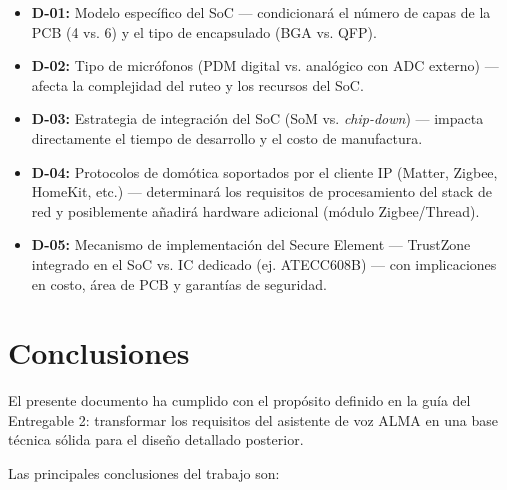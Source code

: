 \documentclass[%
	paper=a4,
	twoside=false,
	parskip=half,
	chapterprefix=false,
	10pt,
	headings=normal,
	bibliography=totoc,
	listof=totoc,
	titlepage=on,
	captions=tableabove,
	draft=false, 
]{scrbook}%
\begin{document}
\begin{itemize}
    \item \textbf{D-01:} Modelo específico del SoC — condicionará el número de capas de la PCB (4 vs. 6) y el tipo de encapsulado (BGA vs. QFP).
    \item \textbf{D-02:} Tipo de micrófonos (PDM digital vs. analógico con ADC externo) — afecta la complejidad del ruteo y los recursos del SoC.
    \item \textbf{D-03:} Estrategia de integración del SoC (SoM vs. \textit{chip-down}) — impacta directamente el tiempo de desarrollo y el costo de manufactura.
    \item \textbf{D-04:} Protocolos de domótica soportados por el cliente IP (Matter, Zigbee, HomeKit, etc.) — determinará los requisitos de procesamiento del stack de red y posiblemente añadirá hardware adicional (módulo Zigbee/Thread).
    \item \textbf{D-05:} Mecanismo de implementación del Secure Element — TrustZone integrado en el SoC vs. IC dedicado (ej. ATECC608B) — con implicaciones en costo, área de PCB y garantías de seguridad.
\end{itemize}

\chapter{Conclusiones}

El presente documento ha cumplido con el propósito definido en la guía del Entregable 2: transformar los requisitos del asistente de voz ALMA en una base técnica sólida para el diseño detallado posterior.

Las principales conclusiones del trabajo son:
\end{document}
